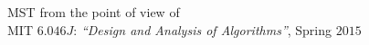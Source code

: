 
\begin{frame}{}

  \begin{center}
    MST from the point of view of  \\[8pt]

    MIT $6.046J$: {\it ``Design and Analysis of Algorithms''}, Spring $2015$
  \end{center}
\end{frame}


